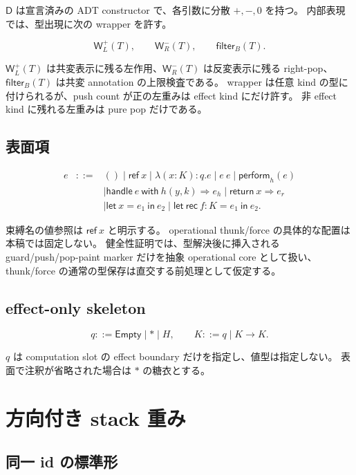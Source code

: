 \documentclass[uplatex,dvipdfmx,a4paper,10.5pt]{jsarticle}
\theoremstyle{jpplain}
\newcommand{\Empty}{\mathsf{Empty}}
\newcommand{\Filter}[2]{\mathsf{filter}_{#1}(#2)}
\newcommand{\PWeight}[2]{\mathsf{W}^{+}_{#1}(#2)}
\newcommand{\NWeight}[2]{\mathsf{W}^{-}_{#1}(#2)}
\newcommand{\kw}[1]{\mathsf{#1}}
\begin{document}
$\kw{D}$ は宣言済みの ADT constructor で、各引数に分散 $+, -, 0$ を持つ。
内部表現では、型出現に次の wrapper を許す。

\[
  \PWeight{L}{T},\qquad
  \NWeight{R}{T},\qquad
  \Filter{B}{T}.
\]

$\PWeight{L}{T}$ は共変表示に残る左作用、$\NWeight{R}{T}$ は反変表示に残る right-pop、
$\Filter{B}{T}$ は共変 annotation の上限検査である。
wrapper は任意 kind の型に付けられるが、push count が正の左重みは effect kind にだけ許す。
非 effect kind に残れる左重みは pure pop だけである。

\subsection{表面項}

\[
\begin{array}{rcl}
e &::=& () \mid \kw{ref}\ x
 \mid \lambda(x:K):q.e
 \mid e\ e
 \mid \kw{perform}_{h}(e)\\
&& \mid \kw{handle}\ e\ \kw{with}\ h(y,k)\Rightarrow e_h
       \mid \kw{return}\ x\Rightarrow e_r\\
&& \mid \kw{let}\ x=e_1\ \kw{in}\ e_2
 \mid \kw{let\ rec}\ f:K=e_1\ \kw{in}\ e_2.
\end{array}
\]

束縛名の値参照は $\kw{ref}\ x$ と明示する。
operational thunk/force の具体的な配置は本稿では固定しない。
健全性証明では、型解決後に挿入される guard/push/pop-paint marker だけを抽象 operational core として扱い、
thunk/force の通常の型保存は直交する前処理として仮定する。

\subsection{effect-only skeleton}

\[
  q ::= \Empty \mid \ast \mid H,
  \qquad
  K ::= q \mid K\to K.
\]

$q$ は computation slot の effect boundary だけを指定し、値型は指定しない。
表面で注釈が省略された場合は $\ast$ の糖衣とする。

\section{方向付き stack 重み}

\subsection{同一 id の標準形}
\end{document}

